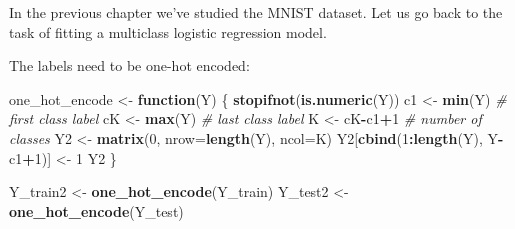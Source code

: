 \documentclass[10pt,b5paper,krantz1]{krantz}
\newenvironment{Shaded}{\begin{snugshade}}{\end{snugshade}}
\newcommand{\CommentTok}[1]{\textcolor[rgb]{0.37,0.37,0.37}{\textit{#1}}}
\newcommand{\ControlFlowTok}[1]{\textcolor[rgb]{0.27,0.27,0.27}{\textbf{#1}}}
\newcommand{\DataTypeTok}[1]{\textcolor[rgb]{0.27,0.27,0.27}{#1}}
\newcommand{\DecValTok}[1]{\textcolor[rgb]{0.06,0.06,0.06}{#1}}
\newcommand{\KeywordTok}[1]{\textcolor[rgb]{0.27,0.27,0.27}{\textbf{#1}}}
\newcommand{\NormalTok}[1]{#1}
\newcommand{\OperatorTok}[1]{\textcolor[rgb]{0.43,0.43,0.43}{\textbf{#1}}}
\newcommand{\StringTok}[1]{\textcolor[rgb]{0.5,0.5,0.5}{#1}}
\begin{document}
In the previous chapter we've
studied the MNIST dataset.
Let us go back to the task of fitting a multiclass logistic regression model.

\begin{Shaded}
\end{Shaded}

The labels need to be one-hot encoded:

\begin{Shaded}
\begin{Highlighting}[]
\NormalTok{one_hot_encode <-}\StringTok{ }\ControlFlowTok{function}\NormalTok{(Y) \{}
    \KeywordTok{stopifnot}\NormalTok{(}\KeywordTok{is.numeric}\NormalTok{(Y))}
\NormalTok{    c1 <-}\StringTok{ }\KeywordTok{min}\NormalTok{(Y) }\CommentTok{# first class label}
\NormalTok{    cK <-}\StringTok{ }\KeywordTok{max}\NormalTok{(Y) }\CommentTok{# last class label}
\NormalTok{    K <-}\StringTok{ }\NormalTok{cK}\OperatorTok{-}\NormalTok{c1}\OperatorTok{+}\DecValTok{1} \CommentTok{# number of classes}
\NormalTok{    Y2 <-}\StringTok{ }\KeywordTok{matrix}\NormalTok{(}\DecValTok{0}\NormalTok{, }\DataTypeTok{nrow=}\KeywordTok{length}\NormalTok{(Y), }\DataTypeTok{ncol=}\NormalTok{K)}
\NormalTok{    Y2[}\KeywordTok{cbind}\NormalTok{(}\DecValTok{1}\OperatorTok{:}\KeywordTok{length}\NormalTok{(Y), Y}\OperatorTok{-}\NormalTok{c1}\OperatorTok{+}\DecValTok{1}\NormalTok{)] <-}\StringTok{ }\DecValTok{1}
\NormalTok{    Y2}
\NormalTok{\}}

\NormalTok{Y_train2 <-}\StringTok{ }\KeywordTok{one_hot_encode}\NormalTok{(Y_train)}
\NormalTok{Y_test2 <-}\StringTok{ }\KeywordTok{one_hot_encode}\NormalTok{(Y_test)}
\end{Highlighting}
\end{Shaded}
\end{document}
